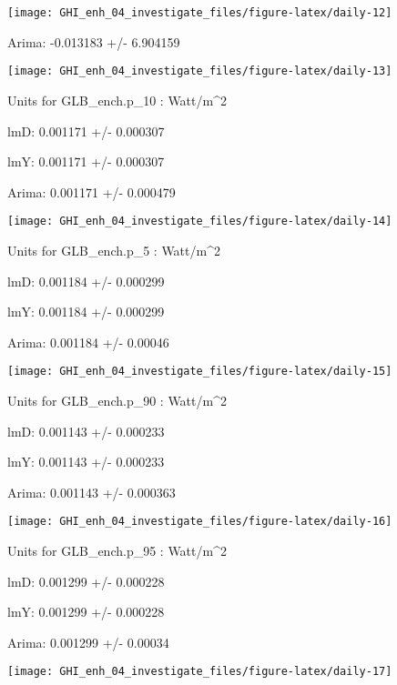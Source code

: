 \documentclass[
  10pt,
  a4paper,oneside]{article}
\begin{document}
\begin{center}\texttt{[image: GHI\_enh\_04\_investigate\_files/figure-latex/daily-12]} \end{center}

Arima: -0.013183 +/- 6.904159

\begin{center}\texttt{[image: GHI\_enh\_04\_investigate\_files/figure-latex/daily-13]} \end{center}

Units for GLB\_ench.p\_10 : Watt/m\^{}2

lmD: 0.001171 +/- 0.000307

lmY: 0.001171 +/- 0.000307

Arima: 0.001171 +/- 0.000479

\begin{center}\texttt{[image: GHI\_enh\_04\_investigate\_files/figure-latex/daily-14]} \end{center}

Units for GLB\_ench.p\_5 : Watt/m\^{}2

lmD: 0.001184 +/- 0.000299

lmY: 0.001184 +/- 0.000299

Arima: 0.001184 +/- 0.00046

\begin{center}\texttt{[image: GHI\_enh\_04\_investigate\_files/figure-latex/daily-15]} \end{center}

Units for GLB\_ench.p\_90 : Watt/m\^{}2

lmD: 0.001143 +/- 0.000233

lmY: 0.001143 +/- 0.000233

Arima: 0.001143 +/- 0.000363

\begin{center}\texttt{[image: GHI\_enh\_04\_investigate\_files/figure-latex/daily-16]} \end{center}

Units for GLB\_ench.p\_95 : Watt/m\^{}2

lmD: 0.001299 +/- 0.000228

lmY: 0.001299 +/- 0.000228

Arima: 0.001299 +/- 0.00034

\begin{center}\texttt{[image: GHI\_enh\_04\_investigate\_files/figure-latex/daily-17]} \end{center}
\end{document}

